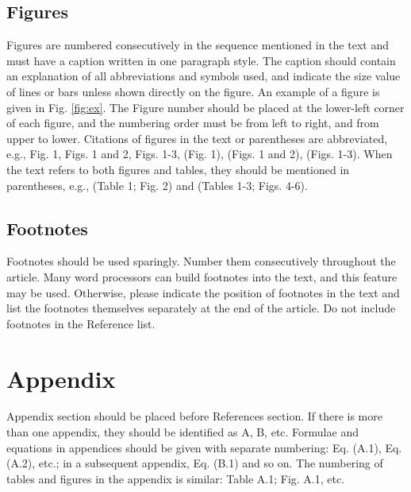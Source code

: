 \documentclass[final,3p,times,twocolumn]{elsarticle}
\begin{document}
\subsection{Figures}
Figures are numbered consecutively in the sequence mentioned in the text and must have a caption written in one paragraph style. 
The caption should contain an explanation of all abbreviations and symbols used, and indicate the size value of lines or bars unless shown directly on the figure. 
An example of a figure is given in Fig. \ref{fig:ex}. 
The Figure number should be placed at the lower-left corner of each figure, and the numbering order must be from left to right, and from upper to lower. 
Citations of figures in the text or parentheses are abbreviated, e.g., Fig. 1, Figs. 1 and 2, Figs. 1-3, (Fig. 1), (Figs. 1 and 2), (Figs. 1-3). 
When the text refers to both figures and tables, they should be mentioned in parentheses, e.g., (Table 1; Fig. 2) and (Tables 1-3; Figs. 4-6).

\subsection{Footnotes}
Footnotes should be used sparingly. Number them consecutively throughout the article. 
Many word processors can build footnotes into the text, and this feature may be used. 
Otherwise, please indicate the position of footnotes in the text and list the footnotes themselves separately at the end of the article. 
Do not include footnotes in the Reference list.



\section*{Appendix}
Appendix section should be placed before References section. 
If there is more than one appendix, they should be identified as A, B, etc. 
Formulae and equations in appendices should be given with separate numbering: Eq. (A.1), Eq. (A.2), etc.; in a subsequent appendix, Eq. (B.1) and so on. 
The numbering of tables and figures in the appendix is similar: Table A.1; Fig. A.1, etc.
\end{document}
